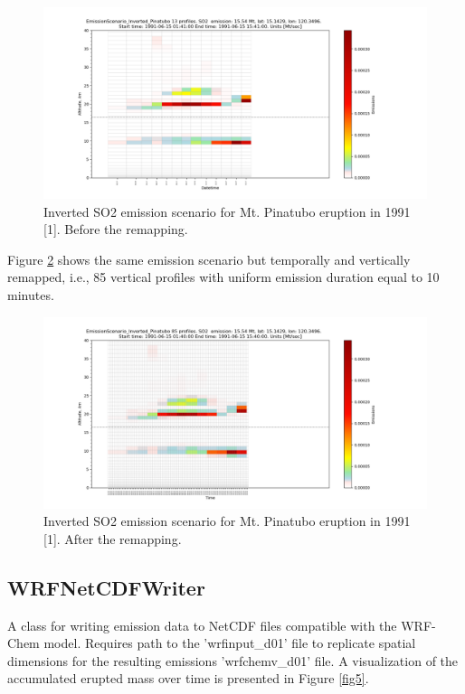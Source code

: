 \documentclass{article}
\begin{document}
\begin{figure}
    \centering
    \includegraphics[width=1\linewidth]{fig3_so2_scenario_pinatubo_before.png}
    \caption{Inverted SO2 emission scenario for Mt. Pinatubo eruption in 1991 [1]. Before the remapping.}
    \label{fig3}
\end{figure}

Figure \ref{fig4} shows the same emission scenario but temporally and vertically remapped, i.e., 85 vertical profiles with uniform emission duration equal to 10 minutes.

\begin{figure}
    \centering
    \includegraphics[width=1\linewidth]{fig4_so2_scenario_pinatubo_after.png}
    \caption{Inverted SO2 emission scenario for Mt. Pinatubo eruption in 1991 [1]. After the remapping.}
    \label{fig4}
\end{figure}

\clearpage
\subsection{WRFNetCDFWriter}
A class for writing emission data to NetCDF files compatible with the WRF-Chem model. Requires path to the 'wrfinput\_d01' file to replicate spatial dimensions for the resulting emissions 'wrfchemv\_d01' file. A visualization of the accumulated erupted mass over time is presented in Figure \ref{fig5}.
\end{document}
